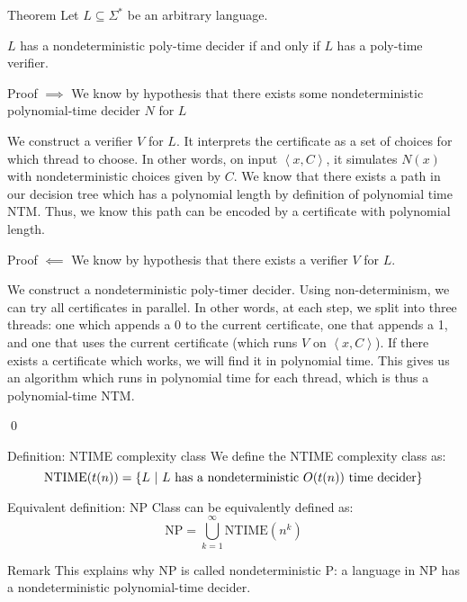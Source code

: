 \documentclass[a4paper]{article}
\begin{document}
\begin{parag}{Theorem}
    Let $L \subseteq \Sigma^*$ be an arbitrary language.

    $L$ has a nondeterministic poly-time decider if and only if $L$ has a poly-time verifier.

    \begin{subparag}{Proof $\implies$}
        We know by hypothesis that there exists some nondeterministic polynomial-time decider $N$ for $L$

        We construct a verifier $V$ for $L$. It interprets the certificate as a set of choices for which thread to choose. In other words, on input $\left\langle x, C \right\rangle$, it simulates $N\left(x\right)$ with nondeterministic choices given by $C$. We know that there exists a path in our decision tree which has a polynomial length by definition of polynomial time NTM. Thus, we know this path can be encoded by a certificate with polynomial length.
    \end{subparag}
    
    \begin{subparag}{Proof $\impliedby$}
        We know by hypothesis that there exists a verifier $V$ for $L$.

        We construct a nondeterministic poly-timer decider. Using non-determinism, we can try all certificates in parallel. In other words, at each step, we split into three threads: one which appends a 0 to the current certificate, one that appends a 1, and one that uses the current certificate (which runs $V$ on $\left\langle x, C \right\rangle$). If there exists a certificate which works, we will find it in polynomial time. This gives us an algorithm which runs in polynomial time for each thread, which is thus a polynomial-time NTM.
        
        \qed
    \end{subparag}
\end{parag}

\begin{parag}{Definition: NTIME complexity class}
    We define the NTIME complexity class as: 
    \[\text{NTIME}\left(t\left(n\right)\right) = \left\{L \suchthat L \text{ has a nondeterministic $O\left(t\left(n\right)\right)$ time decider}\right\}\]
\end{parag}


\begin{parag}{Equivalent definition: NP Class}
     can be equivalently defined as: 
    \[\text{NP} = \bigcup_{k=1}^{\infty} \text{NTIME}\left(n^k\right)\]

    \begin{subparag}{Remark}
        This explains why NP is called nondeterministic P: a language in NP has a nondeterministic polynomial-time decider.
    \end{subparag}
    
\end{parag}
\end{document}
